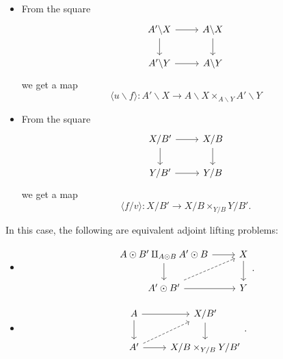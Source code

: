 \documentclass[main.tex]{subfiles}
\begin{document}
\begin{appendix}
\begin{itemize}
    \item From the square
      \begin{equation*}
        \begin{tikzcd}
          A' \backslash X
          \arrow[r]
          \arrow[d]
          & A \backslash X
          \arrow[d]
          \\
          A' \backslash Y
          \arrow[r]
          & A \backslash Y
        \end{tikzcd}
      \end{equation*}
      we get a map
      \begin{equation*}
        \langle u \backslash f \rangle\colon A' \backslash X \to A \backslash X \times_{A \backslash Y} A' \backslash Y
      \end{equation*}

    \item From the square
      \begin{equation*}
        \begin{tikzcd}
          X / B'
          \arrow[r]
          \arrow[d]
          & X / B
          \arrow[d]
          \\
          Y / B'
          \arrow[r]
          & Y / B
        \end{tikzcd}
      \end{equation*}
      we get a map
      \begin{equation*}
    \langle f / v \rangle\colon X / B' \to X / B \times_{Y / B} Y / B'.
      \end{equation*}
  \end{itemize}

  In this case, the following are equivalent adjoint lifting problems:
  \begin{itemize}
    \item
      \begin{equation*}
        \begin{tikzcd}
          A \odot B' \amalg_{A \odot B} A' \odot B
          \arrow[r]
          \arrow[d]
          & X
          \arrow[d]
          \\
          A' \odot B'
          \arrow[r]
          \arrow[ur, dashed]
          & Y
        \end{tikzcd}.
      \end{equation*}

    \item
      \begin{equation*}
        \begin{tikzcd}
          A
          \arrow[r]
          \arrow[d]
          & X / B'
          \arrow[d]
          \\
          A'
          \arrow[r]
          \arrow[ur, dashed]
          & X / B \times_{Y / B} Y / B'
        \end{tikzcd}.
      \end{equation*}


\end{itemize}
\end{appendix}
\end{document}
